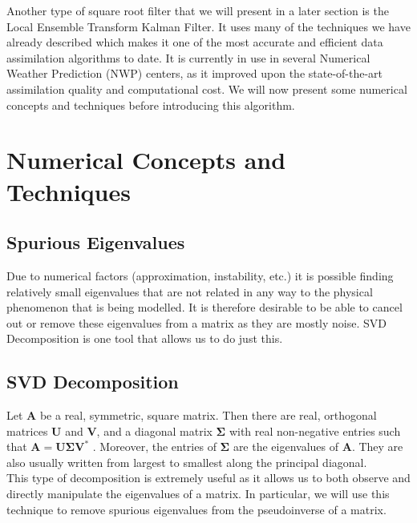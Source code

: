 \documentclass{article}
\begin{document}
Another type of square root filter that we will present in a later section is the Local Ensemble Transform Kalman Filter. It uses many of the techniques we have already described which makes it one of the most accurate and efficient data assimilation algorithms to date. It is currently in use in several Numerical Weather Prediction (NWP) centers, as it improved upon the state-of-the-art assimilation quality and computational cost. We will now present some numerical concepts and techniques before introducing this algorithm. \\

\section{Numerical Concepts and Techniques}

\subsection{Spurious Eigenvalues}

Due to numerical factors (approximation, instability, etc.) it is possible finding relatively small eigenvalues that are not related in any way to the physical phenomenon that is being modelled. It is therefore desirable to be able to cancel out or remove these eigenvalues from a matrix as they are mostly noise. SVD Decomposition is one tool that allows us to do just this. \\

\subsection{SVD Decomposition}

Let $\mathbf{A}$ be a real, symmetric, square matrix. Then there are real, orthogonal matrices $\mathbf{U}$ and $\mathbf{V}$, and a diagonal matrix $\mathbf{\Sigma}$ with real non-negative entries such that $\mathbf{A} = \mathbf{U} \mathbf{\Sigma} \mathbf{V}^*$ \cite{CSTheory}. Moreover, the entries of $\mathbf{\Sigma}$ are the eigenvalues of $\mathbf{A}$. They are also usually written from largest to smallest along the principal diagonal. \\

This type of decomposition is extremely useful as it allows us to both observe and directly manipulate the eigenvalues of a matrix. In particular, we will use this technique to remove spurious eigenvalues from the pseudoinverse of a matrix. \\
\end{document}
